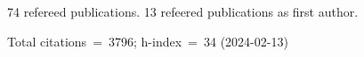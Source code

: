 74 refereed publications. 13 refeered publications as first author.

Total citations~=~3796; h-index~=~34 (2024-02-13)